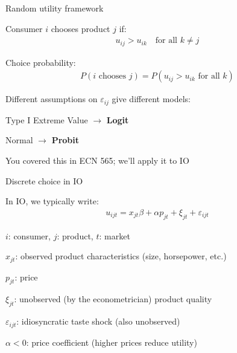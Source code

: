 \documentclass[notes,11pt, aspectratio=169]{beamer}
\newenvironment{wideitemize}{\itemize\addtolength{\itemsep}{10pt}}{\enditemize}
\begin{document}
\begin{frame}{Random utility framework}
	\begin{wideitemize}
		\item Consumer $i$ chooses product $j$ if:
		\begin{align*}
			u_{ij} > u_{ik} \quad \text{for all } k \neq j
		\end{align*}
		\item Choice probability:
		\begin{align*}
			P(i \text{ chooses } j) = P(u_{ij} > u_{ik} \text{ for all } k)
		\end{align*}
		\item Different assumptions on $\varepsilon_{ij}$ give different models:
		\begin{wideitemize}
			\vspace{5pt}
			\item Type I Extreme Value $\rightarrow$ \textbf{Logit}
			\item Normal $\rightarrow$ \textbf{Probit}
		\end{wideitemize}
		\item You covered this in ECN 565; we'll apply it to IO
	\end{wideitemize}
\end{frame}

\begin{frame}{Discrete choice in IO}
	\begin{wideitemize}
		\item In IO, we typically write:
		\begin{align*}
			u_{ijt} = x_{jt} \beta + \alpha p_{jt} + \xi_{jt} + \varepsilon_{ijt}
		\end{align*}
		\item $i$: consumer, $j$: product, $t$: market
		\item $x_{jt}$: observed product characteristics (size, horsepower, etc.)
		\item $p_{jt}$: price
		\item $\xi_{jt}$: unobserved (by the econometrician) product quality
		\item $\varepsilon_{ijt}$: idiosyncratic taste shock (also unobserved)
		\item $\alpha < 0$: price coefficient (higher prices reduce utility)
	\end{wideitemize}
\end{frame}
\end{document}

